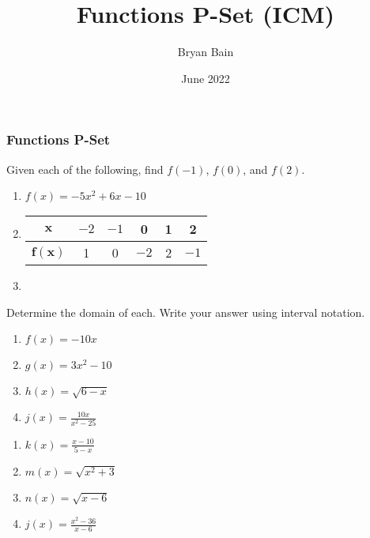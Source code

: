 \documentclass{article}
\title{Functions P-Set (ICM)}
\author{Bryan Bain}
\date{June 2022}
\newcounter{pset}
\begin{document}
\subsubsection*{Functions P-Set}

Given each of the following, find $f(-1)$, $f(0)$, and $f(2)$.
\begin{enumerate}
    \item $f(x) = -5x^2 + 6x - 10$
    \item \begin{tabular}{c|c|c|c|c|c}
        $\pmb{x}$ & $-2$ & $-1$ & 0 & 1 & 2 \\ \hline 
        $\pmb{f(x)}$ & 1 & 0 & $-2$ & 2 & $-1$ \\
    \end{tabular}
    \item \mbox{} \newline 
\end{enumerate}     \setcounter{pset}{\value{enumi}}

Determine the domain of each. Write your answer using interval notation.
\begin{multicols}{4}
\begin{enumerate}   \setcounter{enumi}{\value{pset}}
    \item $f(x) = -10x$
    \item $g(x) = 3x^2 - 10$
    \item $h(x) = \sqrt{6 - x}$
    \item $j(x) = \frac{10x}{x^2-25}$
\end{enumerate}     \setcounter{pset}{\value{enumi}}
\end{multicols}
\begin{multicols}{4}
\begin{enumerate}   \setcounter{enumi}{\value{pset}}
    \item $k(x) = \frac{x-10}{5-x}$
    \item $m(x) = \sqrt{x^2+3}$
    \item $n(x) = \sqrt{x - 6}$
    \item $j(x) = \frac{x^2-36}{x-6}$
\end{enumerate}     \setcounter{pset}{\value{enumi}}
\end{multicols}
\end{document}
